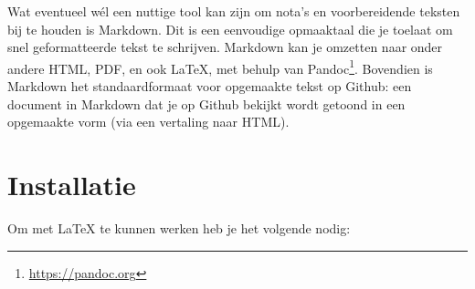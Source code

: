 Wat eventueel wél een nuttige tool kan zijn om nota's en voorbereidende teksten bij te houden is Markdown. Dit is een eenvoudige opmaaktaal die je toelaat om snel geformatteerde tekst te schrijven. Markdown kan je omzetten naar onder andere HTML, PDF, en ook {\LaTeX}, met behulp van Pandoc\footnote{\url{https://pandoc.org}}. Bovendien is Markdown het standaardformaat voor opgemaakte tekst op Github: een document in Markdown dat je op Github bekijkt wordt getoond in een opgemaakte vorm (via een vertaling naar HTML).

\section{Installatie}%
\label{sec:latex-installatie}

Om met {\LaTeX} te kunnen werken heb je het volgende nodig:

